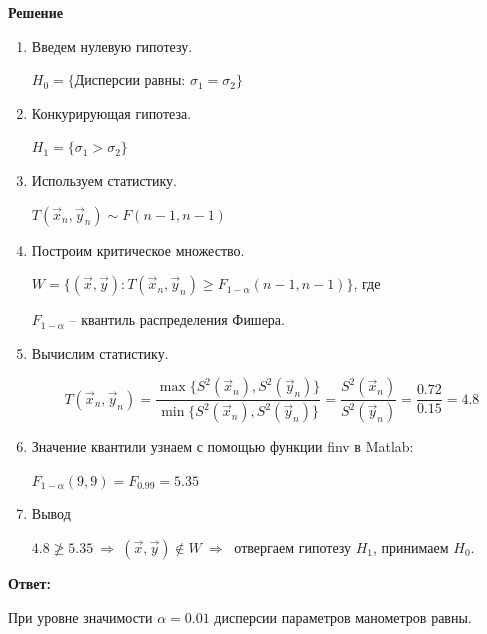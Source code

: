 \documentclass[a4paper,14pt]{extreport} %
\begin{document}
\hfill

\textbf{Решение}

\begin{enumerate}

\item Введем нулевую гипотезу. 

$H_0=\{\text{Дисперсии равны: } \sigma_1=\sigma_2\}$

\item Конкурирующая гипотеза. 

$H_1=\{\sigma_1>\sigma_2\}$

\item Используем статистику. 

$T(\vec x_n,\vec y_n)\sim F(n-1, n-1)$

\item Построим критическое множество. 

$W=\{(\vec x, \vec y):T(\vec x_n,\vec y_n)\ge F_{1-\alpha}(n-1, n-1)\}$, где

$F_{1-\alpha}$ -- квантиль распределения Фишера. 

\item Вычислим статистику. 

$$T(\vec x_n,\vec y_n)=\frac{\max\{S^2(\vec x_n), S^2(\vec y_n)\}}{\min \{S^2(\vec x_n), S^2(\vec y_n)\}}=\frac{S^2(\vec x_n)}{S^2(\vec y_n)}=\frac{0.72}{0.15}=4.8$$

\item Значение квантили узнаем с помощью функции finv в Matlab:

$F_{1-\alpha}(9,9)=F_{0.99}=5.35$

\item Вывод

$4.8 \ngeq 5.35~ \Rightarrow ~ (\vec x, \vec y) \notin W~ \Rightarrow~$ отвергаем гипотезу $H_1$, принимаем $H_0$. 

\end{enumerate}

\hfill

\textbf{Ответ:}

При уровне значимости $\alpha=0.01$ дисперсии параметров манометров равны. 
\end{document}

